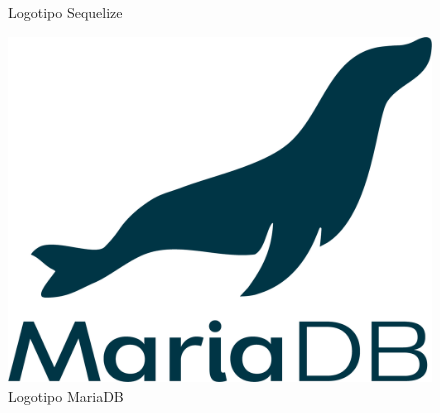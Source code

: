 \documentclass[11pt,spanish,listoffigures,listoftables]{tfgetsinf}
\begin{document}
\begin{figure}[!htb]
     \caption{Logotipo Sequelize}\label{fig:LogoSequelize}
   \endminipage
   \includegraphics[width=\linewidth]{img/mariadb_logo.png}
   \caption{Logotipo MariaDB}\label{fig:LogoMariaDB}
 \endminipage\hfill
\end{figure}
\end{document}
